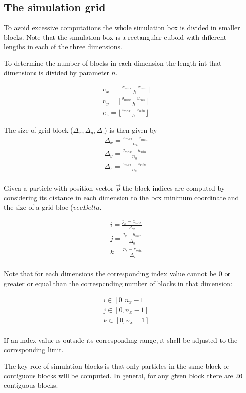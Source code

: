 \subsection{The simulation grid}

To avoid excessive computations the whole simulation box is divided in smaller
blocks. Note that the simulation box is a rectangular cuboid with different
lengths in each of the three dimensions. 

To determine the number of blocks in each dimension the length int that
dimensions is divided by parameter $h$.

\[
\begin{split}
n_x = \lfloor \frac{x_{max}- x_{min}}{h} \rfloor\\
n_y = \lfloor \frac{y_{max}- y_{min}}{h} \rfloor\\
n_z = \lfloor \frac{z_{max}- z_{min}}{h} \rfloor
\end{split}
\]

The size of grid block ($\Delta_x, \Delta_y, \Delta_z$) is then given by
\[
\begin{split}
\Delta_x = \frac{x_{max} - x_{min}}{n_x}\\
\Delta_y = \frac{y_{max} - y_{min}}{n_y}\\
\Delta_z = \frac{z_{max} - z_{min}}{n_z}\\
\end{split}
\] 

Given a particle with position vector $\vec{p}$ the block indices are computed
by considering its distance in each dimension to the box minimum coordinate
and the size of a grid bloc ($vec{Delta}$.

\[
\begin{split}
i = \frac{p_x - x_{min}}{\Delta_x}\\
j = \frac{p_y - y_{min}}{\Delta_y}\\
k = \frac{p_z - z_{min}}{\Delta_z}\\
\end{split}
\]

Note that for each dimensions the corresponding index value cannot be $0$ or
greater or equal than the corresponding number of blocks in that dimension:

\[
\begin{split}
i \in [0, n_x-1]\\
j \in [0, n_x-1]\\
k \in [0, n_x-1]\\
\end{split}
\]

If an index value is outside its corresponding range, it shall be adjusted to
the corresponding limit.

The key role of simulation blocks is that only particles in the same block or
contiguous blocks will be computed. In general, for any given block there are
26 contiguous blocks.
